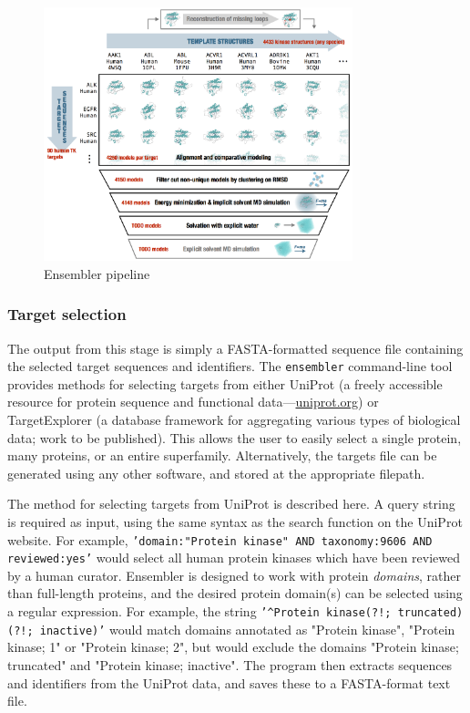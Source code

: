 \documentclass[aps,pre,twocolumn,nofootinbib,superscriptaddress,linenumbers]{revtex4-1}
\begin{document}
\begin{figure}[h]
  \centering
    \includegraphics[width=0.8\textwidth]{pipeline}
  \caption{Ensembler pipeline}
  \label{figpipeline}
\end{figure}

\subsubsection{Target selection}

The output from this stage is simply a FASTA-formatted sequence file containing the selected target sequences and identifiers. 
The {\tt ensembler} command-line tool provides methods for selecting targets from either UniProt (a freely accessible resource for protein sequence and functional data---\href{http://www.uniprot.org/}{uniprot.org}) or TargetExplorer (a database framework for aggregating various types of biological data; work to be published). 
This allows the user to easily select a single protein, many proteins, or an entire superfamily. Alternatively, the targets file can be generated using any other software, and stored at the appropriate filepath.

The method for selecting targets from UniProt is described here. 
A query string is required as input, using the same syntax as the search function on the UniProt website. 
For example, {\tt'domain:"Protein kinase" AND taxonomy:9606 AND reviewed:yes'} would select all human protein kinases which have been reviewed by a human curator. 
Ensembler is designed to work with protein \emph{domains}, rather than full-length proteins, and the desired protein domain(s) can be selected using a regular expression. 
For example, the string {\tt'\^{}Protein kinase(?!; truncated)(?!; inactive)'} would match domains annotated as "Protein kinase", "Protein kinase; 1" or "Protein kinase; 2", but would exclude the domains "Protein kinase; truncated" and "Protein kinase; inactive". 
The program then extracts sequences and identifiers from the UniProt data, and saves these to a FASTA-format text file.
\end{document}

